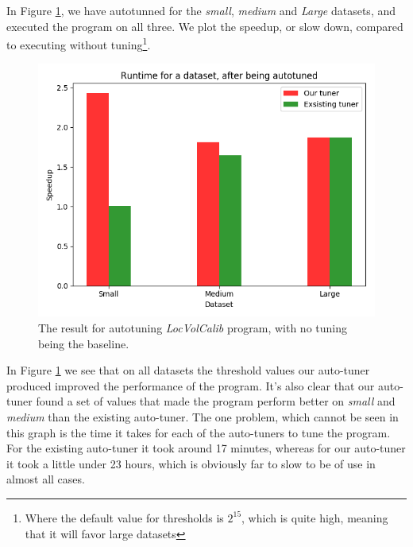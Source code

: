 In Figure \ref{LocVolCalib-SmallMediumLarge}, we have autotunned for the
\textit{small}, \textit{medium} and \textit{Large} datasets, and executed the program on all
three. We plot the speedup, or slow down, compared to executing without
tuning\footnote{Where the default value for thresholds is $2^{15}$, which is
quite high, meaning that it will favor large datasets}.
\begin{figure}
	\centering
	\includegraphics[width=.7\textwidth]{../benchmarks/LocVolCalibSML.png}
  \caption{The result for autotuning \textit{LocVolCalib} program, with no tuning being the baseline.}
	\label{LocVolCalib-SmallMediumLarge}
\end{figure}
In Figure \ref{LocVolCalib-SmallMediumLarge} we see that on all datasets the
threshold values our auto-tuner produced improved the performance of the
program. It's also clear that our auto-tuner found a set of values that made
the program perform better on \textit{small} and \textit{medium} than the
existing auto-tuner. The one problem, which cannot be seen in this graph is the
time it takes for each of the auto-tuners to tune the program. For the existing
auto-tuner it took around 17 minutes, whereas for our auto-tuner it took a
little under 23 hours, which is obviously far to slow to be of use in almost
all cases. 

